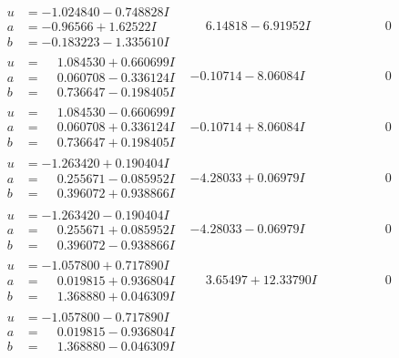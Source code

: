 \documentclass[1p]{elsarticle_modified}
\theoremstyle{definition}
\begin{document}
$$\begin{array}{c|c|c}
\begin{aligned}
u &= -1.024840 - 0.748828 I \\
a &= -0.96566 + 1.62522 I \\
b &= -0.183223 - 1.335610 I\end{aligned}
 & \phantom{-}6.14818 - 6.91952 I & \phantom{-0.000000 } 0 \\ \hline\begin{aligned}
u &= \phantom{-}1.084530 + 0.660699 I \\
a &= \phantom{-}0.060708 - 0.336124 I \\
b &= \phantom{-}0.736647 - 0.198405 I\end{aligned}
 & -0.10714 - 8.06084 I & \phantom{-0.000000 } 0 \\ \hline\begin{aligned}
u &= \phantom{-}1.084530 - 0.660699 I \\
a &= \phantom{-}0.060708 + 0.336124 I \\
b &= \phantom{-}0.736647 + 0.198405 I\end{aligned}
 & -0.10714 + 8.06084 I & \phantom{-0.000000 } 0 \\ \hline\begin{aligned}
u &= -1.263420 + 0.190404 I \\
a &= \phantom{-}0.255671 - 0.085952 I \\
b &= \phantom{-}0.396072 + 0.938866 I\end{aligned}
 & -4.28033 + 0.06979 I & \phantom{-0.000000 } 0 \\ \hline\begin{aligned}
u &= -1.263420 - 0.190404 I \\
a &= \phantom{-}0.255671 + 0.085952 I \\
b &= \phantom{-}0.396072 - 0.938866 I\end{aligned}
 & -4.28033 - 0.06979 I & \phantom{-0.000000 } 0 \\ \hline\begin{aligned}
u &= -1.057800 + 0.717890 I \\
a &= \phantom{-}0.019815 + 0.936804 I \\
b &= \phantom{-}1.368880 + 0.046309 I\end{aligned}
 & \phantom{-}3.65497 + 12.33790 I & \phantom{-0.000000 } 0 \\ \hline\begin{aligned}
u &= -1.057800 - 0.717890 I \\
a &= \phantom{-}0.019815 - 0.936804 I \\
b &= \phantom{-}1.368880 - 0.046309 I\end{aligned}

\end{array}$$
\end{document}
